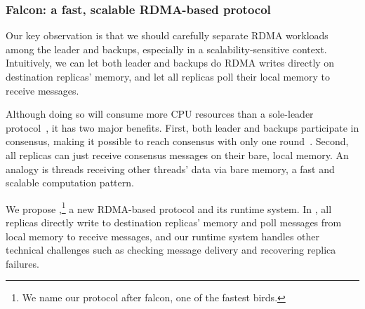 \vspace{-.15in}\subsubsection{Falcon: a fast, scalable RDMA-based \paxos 
protocol} 
\label{sec:falcon}\vspace{-.075in}

Our key observation is that we should carefully separate RDMA workloads among
the leader and backups, especially in a scalability-sensitive context. 
Intuitively, we can let both leader and backups do RDMA writes directly on 
destination replicas' memory, and let all replicas poll their local memory to 
receive messages.

Although doing so will consume more CPU resources than a sole-leader 
protocol~\cite{dare:hpdc15}, it has two major benefits. First, both leader and 
backups participate in consensus, making it possible to reach consensus 
with only one round~\cite{paxos:practical}. Second, all replicas can just 
receive consensus messages on their bare, local memory. An analogy is threads 
receiving other threads' data via bare memory, a fast and scalable computation 
pattern.

We propose \falcon,\footnote{We name our protocol after
falcon, one of the fastest birds.} a new RDMA-based \paxos protocol and its
runtime system. In \xxx, all replicas directly write to destination
replicas' memory and poll messages from local memory to receive messages, and 
our runtime system handles other technical challenges such as checking message 
delivery and recovering replica failures.

